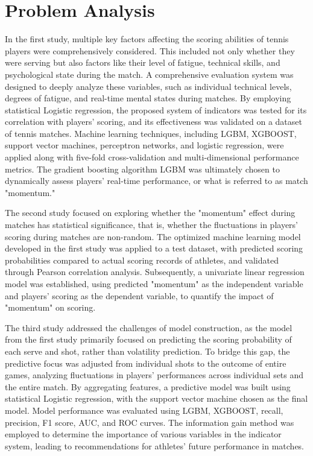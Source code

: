 \documentclass[12pt]{article}
\begin{document}
\section{Problem Analysis}
In the first study, multiple key factors affecting the scoring abilities of tennis players were comprehensively considered. This included not only whether they were serving but also factors like their level of fatigue, technical skills, and psychological state during the match. A comprehensive evaluation system was designed to deeply analyze these variables, such as individual technical levels, degrees of fatigue, and real-time mental states during matches. By employing statistical Logistic regression, the proposed system of indicators was tested for its correlation with players' scoring, and its effectiveness was validated on a dataset of tennis matches. Machine learning techniques, including LGBM, XGBOOST, support vector machines, perceptron networks, and logistic regression, were applied along with five-fold cross-validation and multi-dimensional performance metrics. The gradient boosting algorithm LGBM was ultimately chosen to dynamically assess players' real-time performance, or what is referred to as match "momentum."

The second study focused on exploring whether the "momentum" effect during matches has statistical significance, that is, whether the fluctuations in players' scoring during matches are non-random. The optimized machine learning model developed in the first study was applied to a test dataset, with predicted scoring probabilities compared to actual scoring records of athletes, and validated through Pearson correlation analysis. Subsequently, a univariate linear regression model was established, using predicted "momentum" as the independent variable and players' scoring as the dependent variable, to quantify the impact of "momentum" on scoring.

The third study addressed the challenges of model construction, as the model from the first study primarily focused on predicting the scoring probability of each serve and shot, rather than volatility prediction. To bridge this gap, the predictive focus was adjusted from individual shots to the outcome of entire games, analyzing fluctuations in players' performances across individual sets and the entire match. By aggregating features, a predictive model was built using statistical Logistic regression, with the support vector machine chosen as the final model. Model performance was evaluated using LGBM, XGBOOST, recall, precision, F1 score, AUC, and ROC curves. The information gain method was employed to determine the importance of various variables in the indicator system, leading to recommendations for athletes' future performance in matches.
\end{document}
